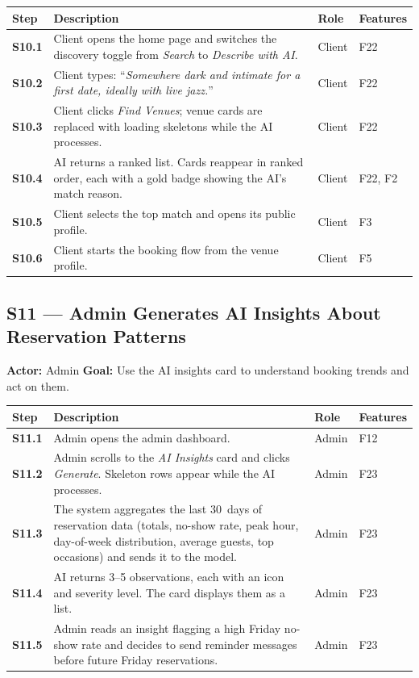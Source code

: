 \documentclass[12pt,a4paper,oneside]{report}
\begin{document}
\begin{longtable}{>{\bfseries}l L{6.2cm} l L{2.8cm}}
  \toprule
  Step & Description & Role & Features \\
  \midrule
  S10.1 & Client opens the home page and switches the discovery toggle from
          \emph{Search} to \emph{Describe with AI}. & Client & F22 \\
  S10.2 & Client types: ``\textit{Somewhere dark and intimate for a first date,
          ideally with live jazz.}'' & Client & F22 \\
  S10.3 & Client clicks \emph{Find Venues}; venue cards are replaced with
          loading skeletons while the AI processes. & Client & F22 \\
  S10.4 & AI returns a ranked list. Cards reappear in ranked order, each with
          a gold badge showing the AI's match reason. & Client & F22, F2 \\
  S10.5 & Client selects the top match and opens its public profile. & Client & F3 \\
  S10.6 & Client starts the booking flow from the venue profile. & Client & F5 \\
  \bottomrule
\end{longtable}

\subsection*{S11 --- Admin Generates AI Insights About Reservation Patterns}
\begin{mdframed}[style=scenariobox]
\textbf{Actor:} Admin \quad
\textbf{Goal:} Use the AI insights card to understand booking trends and act
on them.
\end{mdframed}

\begin{longtable}{>{\bfseries}l L{6.2cm} l L{2.8cm}}
  \toprule
  Step & Description & Role & Features \\
  \midrule
  S11.1 & Admin opens the admin dashboard. & Admin & F12 \\
  S11.2 & Admin scrolls to the \emph{AI Insights} card and clicks
          \emph{Generate}. Skeleton rows appear while the AI processes. & Admin & F23 \\
  S11.3 & The system aggregates the last 30~days of reservation data (totals,
          no-show rate, peak hour, day-of-week distribution, average guests,
          top occasions) and sends it to the model. & Admin & F23 \\
  S11.4 & AI returns 3--5 observations, each with an icon and severity level.
          The card displays them as a list. & Admin & F23 \\
  S11.5 & Admin reads an insight flagging a high Friday no-show rate and
          decides to send reminder messages before future Friday reservations. & Admin & F23 \\
  \bottomrule
\end{longtable}
\end{document}
